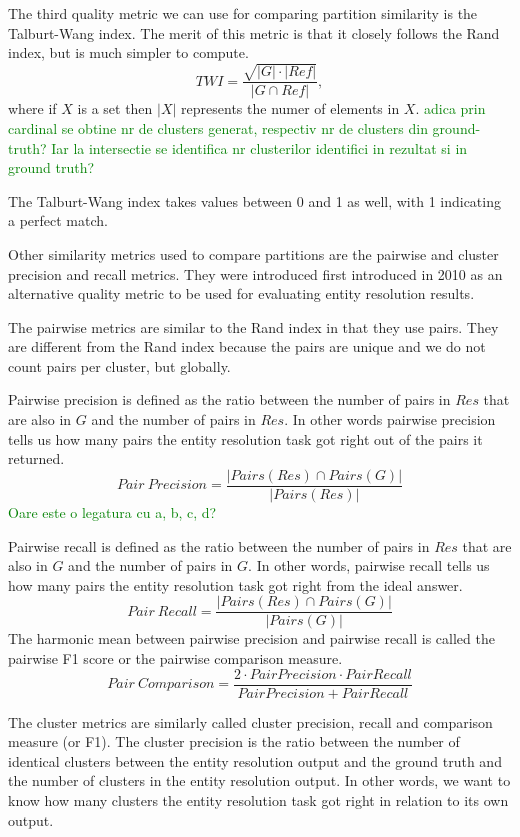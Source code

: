 \documentclass[11pt]{article}
\begin{document}
    The third quality metric we can use for comparing partition similarity is
    the Talburt-Wang index.
    The merit of this metric is that it closely follows the Rand index, but is
    much simpler to compute\cite{Tal11}.
    \[
        TWI = \frac{\sqrt{|G|\cdot|Ref|}}{|G \cap Ref|},
    \]
    where if $X$ is a set then $|X|$ represents the numer of elements in $X$.
    \textcolor{green}{adica prin cardinal se obtine nr de clusters generat, respectiv nr de clusters din ground-truth? Iar la intersectie se identifica nr clusterilor identifici in rezultat si in ground truth?}

    The Talburt-Wang index takes values between 0 and 1 as well, with 1
    indicating a perfect match.

    Other similarity metrics used to compare partitions are the pairwise and
    cluster precision and recall metrics.
    They were introduced first introduced in 2010 as an alternative quality
    metric to be used for evaluating entity resolution results\cite{Men10}.

    The pairwise metrics are similar to the Rand index in that they use pairs.
    They are different from the Rand index because the pairs are unique and we
    do not count pairs per cluster, but globally.
    
    Pairwise precision is defined as the ratio between the number of pairs in
    $Res$ that are also in $G$ and the number of pairs in $Res$.
    In other words pairwise precision tells us how many pairs the entity
    resolution task got right out of the pairs it returned.
    \[
        Pair~Precision = \frac{|Pairs(Res) \cap Pairs(G)|}{|Pairs(Res)|}
    \]
    \textcolor{green}{Oare este o legatura cu a, b, c, d?}

    Pairwise recall is defined as the ratio between the number of pairs in
    $Res$ that are also in $G$ and the number of pairs in $G$.
    In other words, pairwise recall tells us how many pairs the entity
    resolution task got right from the ideal answer.
    \[
        Pair~Recall = \frac{|Pairs(Res) \cap Pairs(G)|}{|Pairs(G)|}
    \]
    The harmonic mean between pairwise precision and pairwise recall is called
    the pairwise F1 score or the pairwise comparison measure\cite{Men10}.
    \[
        Pair~Comparison = \frac{
            2 \cdot Pair Precision \cdot Pair Recall
        }{Pair Precision + Pair Recall}
    \]

    The cluster metrics are similarly called cluster precision, recall and
    comparison measure (or F1).
    The cluster precision is the ratio between the number of identical clusters
    between the entity resolution output and the ground truth and the number of
    clusters in the entity resolution output.
    In other words, we want to know how many clusters the entity resolution task
    got right in relation to its own output.
\end{document}
